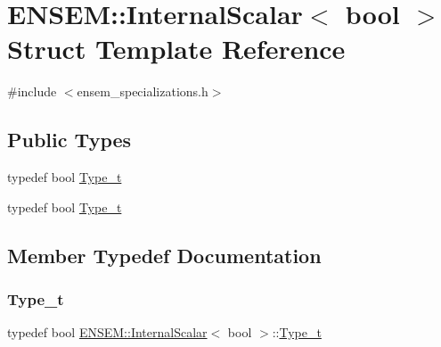 \hypertarget{structENSEM_1_1InternalScalar_3_01bool_01_4}{}\section{E\+N\+S\+EM\+:\+:Internal\+Scalar$<$ bool $>$ Struct Template Reference}
\label{structENSEM_1_1InternalScalar_3_01bool_01_4}


{\ttfamily \#include $<$ensem\+\_\+specializations.\+h$>$}

\subsection*{Public Types}
\begin{DoxyCompactItemize}
\item 
typedef bool \mbox{\hyperlink{structENSEM_1_1InternalScalar_3_01bool_01_4_a3fe5fad0f8af43221744c3ddb40131a0}{Type\+\_\+t}}
\item 
typedef bool \mbox{\hyperlink{structENSEM_1_1InternalScalar_3_01bool_01_4_a3fe5fad0f8af43221744c3ddb40131a0}{Type\+\_\+t}}
\end{DoxyCompactItemize}


\subsection{Member Typedef Documentation}
\mbox{\label{structENSEM_1_1InternalScalar_3_01bool_01_4_a3fe5fad0f8af43221744c3ddb40131a0}} 
\subsubsection{\texorpdfstring{Type\_t}{Type\_t}\hspace{0.1cm}{\footnotesize\ttfamily [1/2]}}
{\footnotesize\ttfamily typedef bool \mbox{\hyperlink{structENSEM_1_1InternalScalar}{E\+N\+S\+E\+M\+::\+Internal\+Scalar}}$<$ bool $>$\+::\mbox{\hyperlink{structENSEM_1_1InternalScalar_3_01bool_01_4_a3fe5fad0f8af43221744c3ddb40131a0}{Type\+\_\+t}}}

\mbox{\label{structENSEM_1_1InternalScalar_3_01bool_01_4_a3fe5fad0f8af43221744c3ddb40131a0}} 
